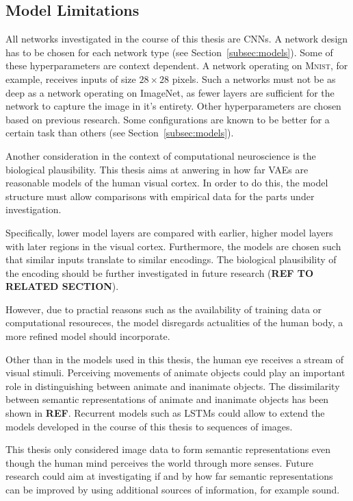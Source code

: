 \subsection{Model Limitations}\label{subsec:model-limitations}
All networks investigated in the course of this thesis are \acp{CNN}.
A network design has to be chosen for each network type (see Section~\ref{subsec:models}).
Some of these hyperparameters are context dependent.
A network operating on \textsc{Mnist}, for example, receives inputs of size $28\times 28$ pixels.
Such a networks must not be as deep as a network operating on ImageNet, as fewer layers are sufficient for the network to capture the image in it's entirety.
Other hyperparameters are chosen based on previous research.
Some configurations are known to be better for a certain task than others (see Section~\ref{subsec:models}).

Another consideration in the context of computational neuroscience is the biological plausibility.
This thesis aims at anwering in how far \acp{VAE} are reasonable models of the human visual cortex.
In order to do this, the model structure must allow comparisons with empirical data for the parts under investigation.

Specifically, lower model layers are compared with earlier, higher model layers with later regions in the visual cortex.
Furthermore, the models are chosen such that similar inputs translate to similar encodings.
The biological plausibility of the encoding should be further investigated in future research (\textbf{REF TO RELATED SECTION}).

However, due to practial reasons such as the availability of training data or computational resoureces, the model disregards actualities of the human body, a more refined model should incorporate.

Other than in the models used in this thesis, the human eye receives a stream of visual stimuli.
Perceiving movements of animate objects could play an important role in distinguishing between animate and inanimate objects.
The dissimilarity between semantic representations of animate and inanimate objects has been shown in \textbf{REF}.
Recurrent models such as LSTMs could allow to extend the models developed in the course of this thesis to sequences of images.

This thesis only considered image data to form semantic representations even though the human mind perceives the world through more senses.
Future research could aim at investigating if and by how far semantic representations can be improved by using additional sources of information, for example sound.

